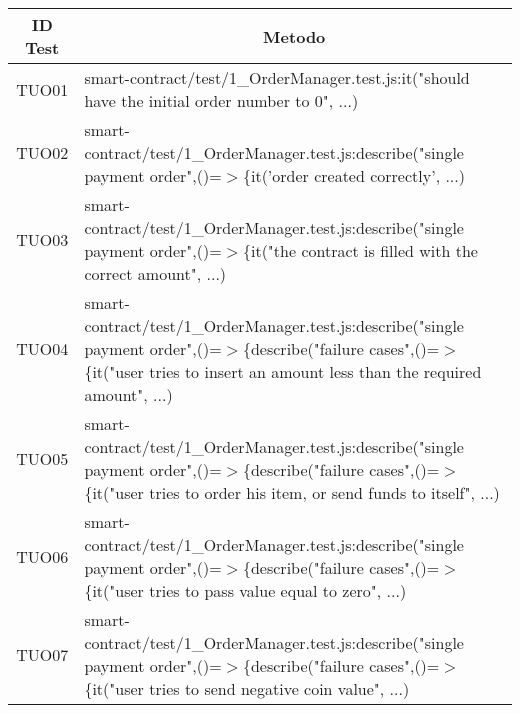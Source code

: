 \begin{table}[H]
  \centering
  \renewcommand{\arraystretch}{1.8}
  \begin{tabular}{c|p{15cm}}
    \rowcolor[HTML]{125E28}
    \color[HTML]{FFFFFF}\textbf{ID Test}
          & \multicolumn{1}{c}{\color[HTML]{FFFFFF}\textbf{Metodo}}                                                                                                                                                   \\
    \hline
    TUO01 & smart-contract/test/1\_OrderManager.test.js:it("should have the initial order number to 0", ...)                                                                                                          \\
    TUO02 & smart-contract/test/1\_OrderManager.test.js:describe("single payment order",\newline()=$>$\{it('order created correctly', ...)                                                                            \\
    TUO03 & smart-contract/test/1\_OrderManager.test.js:describe("single payment order",\newline()=$>$\{it("the contract is filled with the correct amount", ...)                                                     \\
    TUO04 & smart-contract/test/1\_OrderManager.test.js:describe("single payment order",\newline()=$>$\{describe("failure cases",()=$>$\{it("user tries to insert an amount less than the required amount", ...)      \\
    TUO05 & smart-contract/test/1\_OrderManager.test.js:describe("single payment order",\newline()=$>$\{describe("failure cases",()=$>$\{it("user tries to order his item, or send funds to itself", ...)             \\
    TUO06 & smart-contract/test/1\_OrderManager.test.js:describe("single payment order",\newline()=$>$\{describe("failure cases",()=$>$\{it("user tries to pass value equal to zero", ...)                            \\
    TUO07 & smart-contract/test/1\_OrderManager.test.js:describe("single payment order",\newline()=$>$\{describe("failure cases",()=$>$\{it("user tries to send negative coin value", ...)                            \\

\end{tabular}
\end{table}
